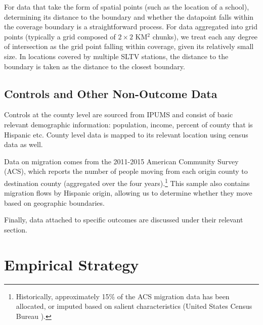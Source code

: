\documentclass[11pt]{article}
\begin{document}
For data that take the form of spatial points (such as the location of a school), determining its distance to the boundary and whether the datapoint falls within the coverage boundary is a straightforward process.  For data aggregated into grid points (typically a grid composed of $2 \times 2$ KM$^2$ chunks), we treat each any degree of intersection as the grid point falling within coverage, given its relatively small size. In locations covered by multiple SLTV stations, the distance to the boundary is taken as the distance to the closest boundary. %

\subsection{Controls and Other Non-Outcome Data}
Controls at the county level are sourced from IPUMS and consist of basic relevant demographic information: population, income, percent of county that is Hispanic etc. County level data is mapped to its relevant location using census data as well. 

Data on migration comes from the 2011-2015 American Community Survey (ACS), which reports the number of people moving from each origin county to destination county (aggregated over the four years).\footnote{ Historically, approximately 15\% of the ACS migration data has been allocated, or imputed based on salient characteristics (United States Census Bureau \cite{noauthor_american_2020}). } This sample also contains migration flows by Hispanic origin, allowing us to determine whether they move based on geographic boundaries.

Finally, data attached to specific outcomes are discussed under their relevant section.


\section{Empirical Strategy}\label{s:rd}
\end{document}
